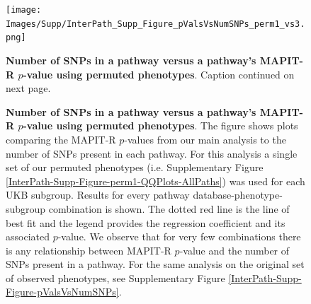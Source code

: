 \setlength{\footskip}{3cm}
\begin{figure}[htbp]
\centering
\vspace*{-2cm}
\texttt{[image: Images/Supp/InterPath\_Supp\_Figure\_pValsVsNumSNPs\_perm1\_vs3.png]}
\caption[TBD]{\textbf{Number of SNPs in a pathway versus a pathway's MAPIT-R $p$-value using permuted phenotypes}. Caption continued on next page.}
\label{InterPath-Supp-Figure-pValsVsNumSNPs-perm1}
\end{figure}
\clearpage
\setlength{\footskip}{1cm}

\addtocounter{figure}{-1}
\begin{figure} [t!]
  \caption{\textbf{Number of SNPs in a pathway versus a pathway's MAPIT-R $p$-value using permuted phenotypes}. The figure shows plots comparing the MAPIT-R $p$-values from our main analysis to the number of SNPs present in each pathway. For this analysis a single set of our permuted phenotypes (i.e. Supplementary Figure \ref{InterPath-Supp-Figure-perm1-QQPlots-AllPaths}) was used for each UKB subgroup. Results for every pathway database-phenotype-subgroup combination is shown. The dotted red line is the line of best fit and the legend provides the regression coefficient and its associated $p$-value. We observe that for very few combinations there is any relationship between MAPIT-R $p$-value and the number of SNPs present in a pathway. For the same analysis on the original set of observed phenotypes, see Supplementary Figure \ref{InterPath-Supp-Figure-pValsVsNumSNPs}.}
\label{InterPath-Supp-Figure-pValsVsNumSNPs-perm1-Caption}
\end{figure}
\clearpage


